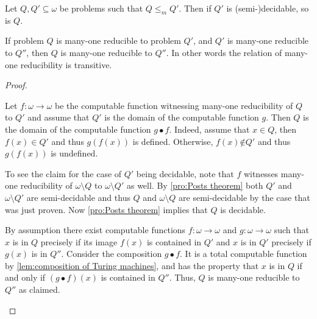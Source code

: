 \begin{pro}\label{pro:m reducibility and decidability}
  \begin{thmlist}
    \item Let \(Q, Q' \subseteq ω\) be problems such that \(Q ≤_m Q'\). Then if
    \(Q'\) is \hbox{(semi-)}de\-cid\-able, so is \(Q\).

    \item If problem \(Q\) is many-one reducible to problem \(Q'\), and \(Q'\)
    is many-one reducible to \(Q''\), then \(Q\) is many-one reducible to
    \(Q''\). In other words the relation of many-one reducibility is transitive.
  \end{thmlist}
\end{pro}
\begin{proof}
  \begin{plist}
    \item   Let \(f: ω → ω\) be the computable function witnessing many-one
    reducibility of \(Q\) to \(Q'\) and assume that \(Q'\) is the domain of the
    computable function \(g\). Then \(Q\) is the domain of the computable
    function \(g • f\). Indeed, assume that \(x ∈ Q\), then \(f(x) ∈ Q'\) and
    thus \(g(f(x))\) is defined. Otherwise, \(f(x) \not∈ Q'\) and thus
    \(g(f(x))\) is undefined.

    To see the claim for the case of \(Q'\) being decidable, note that \(f\)
    witnesses many-one reducibility of \(ω \setminus Q\) to \(ω \setminus Q'\)
    as well. By \cref{pro:Posts theorem} both \(Q'\) and \(ω \setminus Q'\) are
    semi-decidable and thus \(Q\) and \(ω \setminus Q\) are semi-decidable by
    the case that was just proven. Now \cref{pro:Posts theorem} implies that
    \(Q\) is decidable.

    \item By assumption there exist computable functions \(f: ω → ω\) and \(g:
    ω → ω\) such that \(x\) is in \(Q\) precisely if its image \(f(x)\) is
    contained in \(Q'\) and \(x\) is in \(Q'\) precisely if \(g(x)\) is in
    \(Q''\). Consider the composition \(g • f\). It is a total computable
    function by \cref{lem:composition of Turing machines}, and has the property
    that \(x\) is in \(Q\) if and only if \((g • f)(x)\) is contained in
    \(Q''\). Thus, \(Q\) is many-one reducible to \(Q''\) as claimed.
  \end{plist}
\end{proof}
